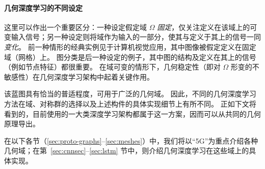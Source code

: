 


\paragraph{几何深度学习的不同设定}
这里可以作出一个重要区分：一种设定假定域 $\Omega$ {\em 固定}，仅关注定义在该域上的可变输入信号；另一种设定则将域作为输入的一部分，使其与定义于其上的信号一同{\em 变化}。
%
前一种情形的经典实例见于计算机视觉应用，其中图像被假定定义在固定域（网格）上。
%
图分类是后一种设定的例子，其中图的结构及定义在其上的信号（例如节点特征）都很重要。
%
在域可变的情形下，几何稳定性（即对 $\Omega$ 形变的不敏感性）在几何深度学习架构中起着关键作用。


该蓝图具有恰当的普适程度，可用于广泛的几何域。
因此，不同的几何深度学习方法在域、对称群的选择以及上述构件的具体实现细节上有所不同。
正如下文将看到的，目前使用的一大类深度学习架构都属于这一方案，因而可以从共同的几何原理导出。
%


在以下各节（\ref{sec:proto-graphs}--\ref{sec:meshes}）中，我们将以“5G”为重点介绍各种几何域；在第~\ref{sec:cnnsec}--\ref{sec:lstm} 节中，则介绍几何深度学习在这些域上的具体实现。



